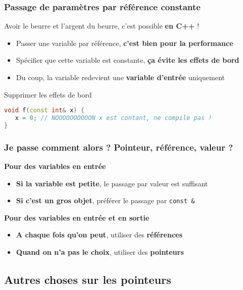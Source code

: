 \documentclass{beamer}
\begin{document}
\begin{frame}[fragile=singleslide,shrink=20]
\frametitle{Passage de paramètres par référence constante}
Avoir le beurre et l'argent du beurre, c'est possible \textbf{en C++} !

\begin{itemize}
\item{Passer une variable par référence, \textbf{c'est bien pour la performance}}
\item{Spécifier que cette variable est constante, \textbf{ça évite les effets de bord}}
\item{Du coup, la variable redevient une \textbf{variable d'entrée} uniquement}
\end{itemize}

\begin{block}{Supprimer les effets de bord}
\begin{lstlisting}[language=c++]
void f(const int& x) {
   x = 0; // NOOOOOOOOOON x est contant, ne compile pas !
}
\end{lstlisting}
\end{block}
\end{frame}

\begin{frame}[fragile=singleslide,shrink=20]
\frametitle{Je passe comment alors ? Pointeur, référence, valeur ?}

\textbf{Pour des variables en entrée}
\begin{itemize}
\item{\textbf{Si la variable est petite}, le passage par valeur est suffisant}
\item{\textbf{Si c'est un gros objet}, préférer le passage par \texttt{const \&}}
\end{itemize}

\textbf{Pour des variables en entrée et en sortie}
\begin{itemize}
\item{\textbf{A chaque fois qu'on peut}, utiliser des \textbf{références}}
\item{\textbf{Quand on n'a pas le choix}, utiliser des \textbf{pointeurs}}
\end{itemize}
\end{frame}

\subsection{Autres choses sur les pointeurs}
\end{document}
